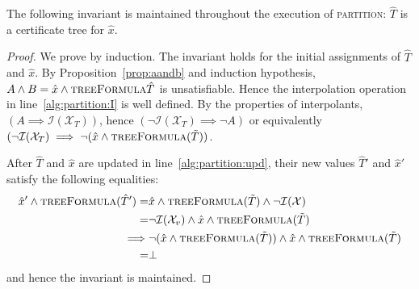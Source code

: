 \begin{proposition}
    The following invariant is maintained throughout the execution of
    \textsc{partition}: $\hat{T}$ is a certificate tree for $\hat{x}$.
\end{proposition}
\begin{proof}
We prove by induction.  The invariant holds for the initial
assignments of $\hat{T}$ and $\hat{x}$. By Proposition~\ref{prop:aandb} and induction hypothesis, $A\land B = \hat{x} \land \textsc{treeFormula}{\hat{T}}$ is unsatisfiable.  Hence the interpolation operation in line~\ref{alg:partition:I} is well defined.  By the properties of interpolants, $(A \implies \mathcal{I}(\mathcal{X}_T))$, hence $(\neg \mathcal{I}(\mathcal{X}_T) \implies \neg A)$ or equivalently $(\neg\mathcal{I}(\mathcal{X}_T) \implies \neg (\hat{x} \land \textsc{treeFormula}(\tilde{T}))$.

After $\hat{T}$ and $\hat{x}$ are updated in line~\ref{alg:partition:upd}, their new values $\hat{T}'$ and $\hat{x}'$ satisfy the following equalities: \begin{align*}
    \hat{x}' \land \textsc{treeFormula}(\hat{T}') =& \hat{x} \land \textsc{treeFormula}(\tilde{T}) \land \neg\mathcal{I}(\mathcal{X}) \\
=& \neg\mathcal{I}(\mathcal{X}_v) \land \hat{x} \land \textsc{treeFormula}(\tilde{T}) \\
    \implies& \neg (\hat{x} \land \textsc{treeFormula}(\tilde{T})) \land \hat{x} \land \textsc{treeFormula}(\tilde{T}) \\
    =& \bot
\end{align*} and hence the invariant is maintained.
\end{proof}

